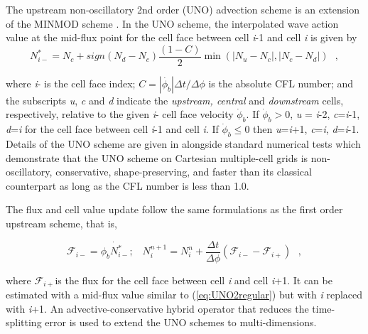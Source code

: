 
\vspace{\baselineskip} 
\vspace{\baselineskip} 


\noindent
The upstream non-oscillatory 2nd order (UNO) advection scheme
\citep{art:Li08} is an extension of the MINMOD scheme \citep{art:Roe86}. In
the UNO scheme, the interpolated wave action value at the mid-flux point for
the cell face between cell \emph{i}-1 and cell \emph{i} is given by
\begin{equation}
N_{i-}^{*}=N_{c}+sign\left(N_{d}-N_{c}\right)\frac{\left(1-C\right)}{2}\min\left(|N_{u}-N_{c}|,|N_{c}-N_{d}|\right) \:\:\: ,
\label{eq:UNO2regular}
\end{equation}

\noindent
where \emph{i}- is the cell face index; $C=\left|\dot{\phi_{b}}\right|\Delta
t/\Delta\phi$ is the absolute CFL number; and the subscripts \emph{u},
\emph{c} and \emph{d} indicate the \emph{upstream, central} and
\emph{downstream} cells, respectively, relative to the given \emph{i}- cell
face velocity $\dot{\phi}_{b}$. If $\dot{\phi}_{b}>0$, \emph{u} = \emph{i}-2,
\emph{c}=\emph{i}-1, \emph{d}=\emph{i} for the cell face between cell
\emph{i}-1 and cell \emph{i}. If $\dot{\phi}_{b}\leq0$ then
\emph{u}=\emph{i}+1, \emph{c}=\emph{i}, \emph{d}=\emph{i}-1. Details of the
UNO scheme are given in \cite{art:Li08} alongside standard numerical tests
which demonstrate that the UNO scheme on Cartesian multiple-cell grids is
non-oscillatory, conservative, shape-preserving, and faster than its classical
counterpart as long as the CFL number is less than 1.0.

The flux and cell value update follow the same formulations as the first order
upstream scheme, that is,

\begin{equation}
\mathcal{F}_{i-}=\dot{\phi_{b}N_{i-}^{*}};\;\;\; N_{i}^{n+1}=N_{i}^{n}+\frac{\Delta t}{\Delta\phi}\left(\mathcal{F}_{i-}-\mathcal{F}_{i+}\right) \:\:\: ,
\end{equation}
 
\noindent
where $\mathcal{F}_{i+}$is the flux for the cell face between cell\emph{ i}
and cell \emph{i}+1. It can be estimated with a mid-flux value similar to
(\ref{eq:UNO2regular}) but with \emph{i} replaced with \emph{i}+1.  An
advective-conservative hybrid operator \citep{art:LLM96} that reduces the
time-splitting error is used to extend the UNO schemes to multi-dimensions.

